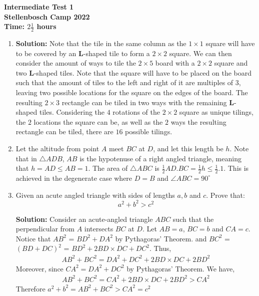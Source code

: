 \documentclass{article}
\begin{document}
\thispagestyle{empty}

\begin{center}
  \textbf{\Large Intermediate Test 1}
  \\ \vspace{1em}
  \textbf{\large Stellenbosch Camp 2022}
  \\ \vspace{1em}
  \textbf{\large Time: $2\frac{1}{2}$ hours}
\end{center}

\bigskip

\begin{enumerate}[itemsep=\fill]
	


\item %
\textbf{Solution:} Note that the tile in the same column as the $1\times1$ square will have to be covered by an $\mathbf{L}$-shaped tile to form a $2\times2$ square. We can then consider the amount of ways to tile the $2\times5$ board with a $2\times2$ square and two $\mathbf{L}$-shaped tiles. Note that the square will have to be placed on the board such that the amount of tiles to the left and right of it are multiples of $3$, leaving two possible locations for the square on the edges of the board. The resulting $2\times3$ rectangle can be tiled in two ways with the remaining $\mathbf{L}$-shaped tiles. Considering the $4$ rotations of the $2\times2$ square as unique tilings, the $2$ locations the square can be, as well as the $2$ ways the resulting rectangle can be tiled, there are $16$ possible tilings. 


\item %
Let the altitude from point $A$ meet $BC$ at $D$, and let this length be $h$. Note that in $\triangle ADB$, $AB$ is the hypotenuse of a right angled triangle, meaning that $h = AD \leq AB = 1$. The area of $\triangle ABC$ is $\frac{1}{2}AD.BC = \frac{1}{2}h \leq \frac{1}{2}.1$. This is achieved in the degenerate case where $D = B$ and $\angle ABC = 90^{\circ}$

\item %
Given an acute angled triangle with sides of lengths $a,b$ and $c$. Prove that: \[a^2 + b^2 > c^2\]

\textbf{Solution:} Consider an acute-angled triangle $ABC$ such that the perpendicular from $A$ intersects $BC$ at $D$. Let $AB=a$, $BC=b$ and $CA=c$. Notice that $AB^{2}$ = $BD^{2} + DA^{2}$ by Pythagoras' Theorem.  and $BC^{2}$ = $(BD + DC)^{2}$ = $BD^{2} + 2BD\times DC + DC^{2}$. Thus,
\begin{align*}
    AB^{2} + BC^{2} = DA^{2} + DC^{2} + 2BD \times DC + 2BD^{2}
\end{align*}
Moreover, since $CA^{2} = DA^{2} + DC^{2}$ by Pythagoras' Theorem. We have,
\begin{align*}
    AB^{2} + BC^{2} = CA^{2} + 2BD \times DC + 2BD^{2} > CA^{2}  
\end{align*}
Therefore $a^{2} + b^{2} = AB^{2} + BC^{2} > CA^{2} = c^{2}$



\end{enumerate}
\end{document}
